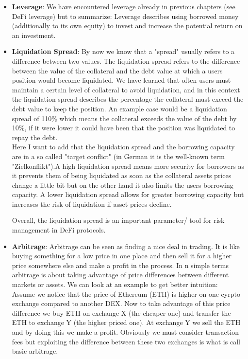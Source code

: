 \documentclass{article}
\begin{document}
\begin{itemize}
\item \textbf{Leverage}: We have encountered leverage already in previous chapters (see DeFi leverage) but to summarize: Leverage describes using borrowed money (additionally to its own equity) to invest and increase the potential return on an investment.

\item \textbf{Liquidation Spread}: By now we know that a "spread" usually refers to a difference between two values. The liquidation spread refers to the difference between the value of the collateral and the debt value at which a users position would become liquidated. We have learned that often users must maintain a certain level of collateral to avoid liquidation, and in this context the liquidation spread describes the percentage the collateral must exceed the debt value to keep the position. An example case would be a liquidation spread of 110\% which means the collateral exceeds the value of the debt by 10\%, if it were lower it could have been that the position was liquidated to repay the debt.\\
Here I want to add that the liquidation spread and the borrowing capacity are in a so called "target conflict" (in German it is the well-known term "Zielkonflikt").A high liquidation spread means more security for borrowers as it prevents them of being liquidated as soon as the collateral assets prices change a little bit but on the other hand it  also limits the users borrowing capacity. A lower liquidation spread allows for greater borrowing capacity but increases the risk of liquidation if asset prices decline.

Overall, the liquidation spread is an important parameter/ tool for risk management in DeFi protocols.

\item \textbf{Arbitrage}: Arbitrage can be seen as finding a nice deal in trading. It is like buying something for a low price in one place and then sell it for a higher price somewhere else and make a profit in the process. In n simple terms arbitrage is about taking advantage of price differences between different markets or assets. We can look at an example to get better intuition:\\
Assume we notice that the price of Ethereum (ETH) is higher on one cyrpto exchange compared to another DEX. Now to take advantage of this price difference we buy ETH on exchange X (the cheaper one) and transfer the ETH to exchange Y (the higher priced one). At exchange Y we sell the ETH and by doing this we make a profit. Obviously we must consider transaction fees but exploiting the difference between these two exchanges is what is call basic arbitrage. 


\end{itemize}
\end{document}
